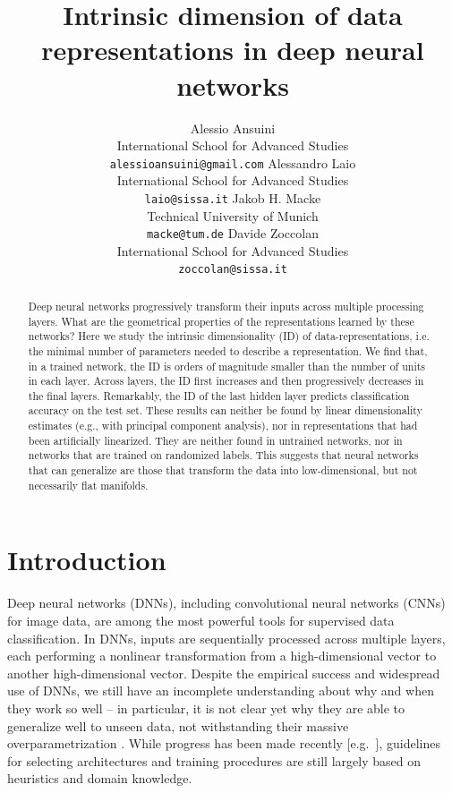 \documentclass{article}
\title{Intrinsic dimension of data representations in deep neural networks}
\author{%
  Alessio Ansuini\\
  International School for Advanced Studies\\ %
  \texttt{alessioansuini@gmail.com}
  \And
  Alessandro Laio\\
  International School for Advanced Studies\\ %
  \texttt{laio@sissa.it}
  \AND
  Jakob H. Macke\\
  Technical University of Munich\\
  \texttt{macke@tum.de}
  \And
  Davide Zoccolan\\
  International School for Advanced Studies\\ %
  \texttt{zoccolan@sissa.it}
}
\begin{document}
\maketitle

\begin{abstract}
Deep  neural networks  progressively transform their inputs across multiple processing layers. What are the geometrical properties of the representations learned by these networks?
Here we study the intrinsic dimensionality (ID) of data-representations, i.e. the minimal number of parameters needed to describe a representation.
We find that, in a trained network, the ID is orders of magnitude smaller than the number of units in each layer. Across layers, the ID first increases and then progressively decreases in the final layers. Remarkably, the ID of the last hidden layer predicts classification accuracy on the test set. These results can  neither be found by linear dimensionality estimates  (e.g., with principal component analysis), nor in representations that had been artificially linearized. They are neither found in untrained networks, nor in networks that are trained on randomized labels. This suggests that neural networks  that can generalize are those that transform the data into low-dimensional, but not necessarily flat
manifolds.
\end{abstract}

\section{Introduction}

Deep neural networks (DNNs), including convolutional neural networks (CNNs) for image data, are among the most powerful tools for supervised data classification. %
In DNNs, inputs are sequentially processed across multiple layers, each performing a nonlinear transformation from a high-dimensional vector to another high-dimensional vector. Despite the empirical success and widespread use of DNNs, we still have an incomplete understanding about why and when they work so well -- in particular, it is not clear yet why they are able to generalize well to unseen data, not withstanding their massive overparametrization \cite{Zhang2017}. While progress has been made  recently [e.g.\ \cite{neyshabur2018towards,lampinen2018analytic}], guidelines for selecting architectures and training procedures are still largely based on heuristics and domain knowledge.
\end{document}
